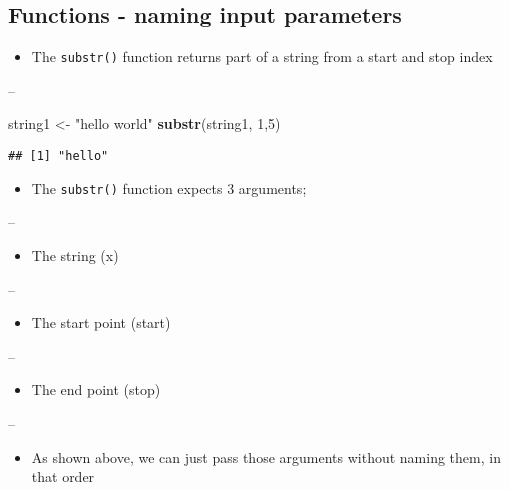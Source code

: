 \documentclass[]{article}
\newenvironment{Shaded}{\begin{snugshade}}{\end{snugshade}}
\newcommand{\DecValTok}[1]{\textcolor[rgb]{0.00,0.00,0.81}{#1}}
\newcommand{\KeywordTok}[1]{\textcolor[rgb]{0.13,0.29,0.53}{\textbf{#1}}}
\newcommand{\NormalTok}[1]{#1}
\newcommand{\StringTok}[1]{\textcolor[rgb]{0.31,0.60,0.02}{#1}}
\providecommand{\tightlist}{%
  \setlength{\itemsep}{0pt}\setlength{\parskip}{0pt}}
\begin{document}
\hypertarget{functions---naming-input-parameters-1}{%
\subsection{Functions - naming input
parameters}\label{functions---naming-input-parameters-1}}

\begin{itemize}
\tightlist
\item
  The \texttt{substr()} function returns part of a string from a start
  and stop index
\end{itemize}

--

\begin{Shaded}
\begin{Highlighting}[]
\NormalTok{string1 <-}\StringTok{ "hello world"}
\KeywordTok{substr}\NormalTok{(string1, }\DecValTok{1}\NormalTok{,}\DecValTok{5}\NormalTok{)}
\end{Highlighting}
\end{Shaded}

\begin{verbatim}
## [1] "hello"
\end{verbatim}

\begin{itemize}
\tightlist
\item
  The \texttt{substr()} function expects 3 arguments;
\end{itemize}

--

\begin{itemize}
\tightlist
\item
  The string (x)
\end{itemize}

--

\begin{itemize}
\tightlist
\item
  The start point (start)
\end{itemize}

--

\begin{itemize}
\tightlist
\item
  The end point (stop)
\end{itemize}

--

\begin{itemize}
\tightlist
\item
  As shown above, we can just pass those arguments without naming them,
  in that order
\end{itemize}
\end{document}
